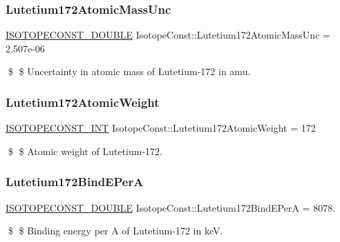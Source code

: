 \subsubsection{\texorpdfstring{Lutetium172\+Atomic\+Mass\+Unc}{Lutetium172AtomicMassUnc}}
{\footnotesize\ttfamily \mbox{\hyperlink{group___isotope_const-_macros_ga8f45a7272ce02c0b4c65c44636ed719a}{I\+S\+O\+T\+O\+P\+E\+C\+O\+N\+S\+T\+\_\+\+D\+O\+U\+B\+LE}} Isotope\+Const\+::\+Lutetium172\+Atomic\+Mass\+Unc = 2.\+507e-\/06}

\$ \$ Uncertainty in atomic mass of Lutetium-\/172 in amu. \mbox{\label{group___isotope_const-_lutetium-_lu172_ga518c01515ada58ae1400660ccbfc406e}} 
\subsubsection{\texorpdfstring{Lutetium172\+Atomic\+Weight}{Lutetium172AtomicWeight}}
{\footnotesize\ttfamily \mbox{\hyperlink{group___isotope_const-_macros_ga5f18360b3e99483a35c32d789e62621c}{I\+S\+O\+T\+O\+P\+E\+C\+O\+N\+S\+T\+\_\+\+I\+NT}} Isotope\+Const\+::\+Lutetium172\+Atomic\+Weight = 172}

\$ \$ Atomic weight of Lutetium-\/172. \mbox{\label{group___isotope_const-_lutetium-_lu172_ga6fdfdc7f0e3f34871a30067ed7c8127f}} 
\subsubsection{\texorpdfstring{Lutetium172\+Bind\+E\+PerA}{Lutetium172BindEPerA}}
{\footnotesize\ttfamily \mbox{\hyperlink{group___isotope_const-_macros_ga8f45a7272ce02c0b4c65c44636ed719a}{I\+S\+O\+T\+O\+P\+E\+C\+O\+N\+S\+T\+\_\+\+D\+O\+U\+B\+LE}} Isotope\+Const\+::\+Lutetium172\+Bind\+E\+PerA = 8078.}

\$ \$ Binding energy per A of Lutetium-\/172 in keV. \mbox{\label{group___isotope_const-_lutetium-_lu172_ga6a742e2aff91a5afe8618bac78b8eaf5}} 
